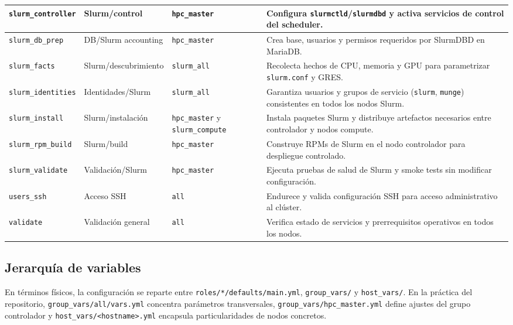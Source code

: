 {\begin{longtable}{|>{\raggedright\arraybackslash}p{2.4cm}|>{\raggedright\arraybackslash}p{3.1cm}|>{\raggedright\arraybackslash}p{3.5cm}|>{\raggedright\arraybackslash}p{5.1cm}|}
\hline
\texttt{slurm\_controller} & Slurm\slash control & \texttt{hpc\_master} & Configura \texttt{slurmctld}/\texttt{slurmdbd} y activa servicios de control del scheduler. \\
\hline
\texttt{slurm\_db\_prep} & DB\slash Slurm accounting & \texttt{hpc\_master} & Crea base, usuarios y permisos requeridos por SlurmDBD en MariaDB. \\
\hline
\texttt{slurm\_facts} & Slurm\slash descubrimiento & \texttt{slurm\_all} & Recolecta hechos de CPU, memoria y GPU para parametrizar \texttt{slurm.conf} y GRES. \\
\hline
\texttt{slurm\_identities} & Identidades\slash Slurm & \texttt{slurm\_all} & Garantiza usuarios y grupos de servicio (\texttt{slurm}, \texttt{munge}) consistentes en todos los nodos Slurm. \\
\hline
\texttt{slurm\_install} & Slurm\slash instalación & \texttt{hpc\_master} y \texttt{slurm\_compute} & Instala paquetes Slurm y distribuye artefactos necesarios entre controlador y nodos compute. \\
\hline
\texttt{slurm\_rpm\_build} & Slurm\slash build & \texttt{hpc\_master} & Construye RPMs de Slurm en el nodo controlador para despliegue controlado. \\
\hline
\texttt{slurm\_validate} & Validación\slash Slurm & \texttt{hpc\_master} & Ejecuta pruebas de salud de Slurm y smoke tests sin modificar configuración. \\
\hline
\texttt{users\_ssh} & Acceso SSH & \texttt{all} & Endurece y valida configuración SSH para acceso administrativo al clúster. \\
\hline
\texttt{validate} & Validación general & \texttt{all} & Verifica estado de servicios y prerrequisitos operativos en todos los nodos. \\
\end{longtable}
}

\subsection{Jerarquía de variables}

En términos físicos, la configuración se reparte entre \texttt{roles/*/defaults/main.yml}, \texttt{group\_vars/} y \texttt{host\_vars/}. En la práctica del repositorio, \texttt{group\_vars/all/vars.yml} concentra parámetros transversales, \texttt{group\_vars/hpc\_master.yml} define ajustes del grupo controlador y \texttt{host\_vars/<hostname>.yml} encapsula particularidades de nodos concretos.

